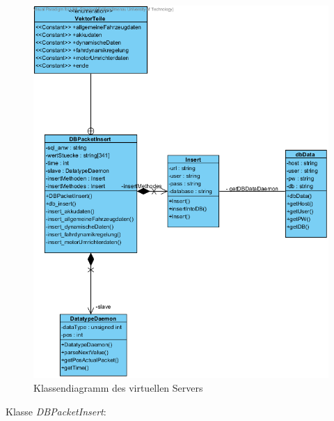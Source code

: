 \documentclass[fontsize = 12pt, paper = a4]{scrreprt}
\begin{document}
\begin{figure}[h]
\centering
\includegraphics[scale = 0.9]{vServer}
\caption[Klassendiagramm des virtuellen Servers]{Klassendiagramm des virtuellen Servers}
\label{classvServer}
\end{figure} 

Klasse \textit{DBPacketInsert}:
\end{document}
